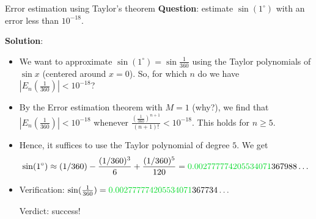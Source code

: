 \begin{frame}{Error estimation using Taylor's theorem}
    \textbf{Question}: estimate $\sin(1^\circ)$ with an error less than $10^{-18}$.

    \vspace{2mm}
    \textbf{Solution}: 
    \begin{itemize}
        \item We want to approximate $\sin(1^\circ)=\sin\frac1{360}$ using the Taylor polynomials of $\sin x$ (centered around $x=0$). So, for which $n$ do we have $|E_n(\frac1{360})|<10^{-18}$?

        \item By the Error estimation theorem with $M=1$ (why?), we find that $|E_n(\frac1{360})|<10^{-18}$ whenever $\frac{(\frac1{360})^{n+1}}{(n+1)!}<10^{-18}$. This holds for $n\geq5$.

        \item Hence, it suffices to use the Taylor polynomial of degree $5$. We get
            {\footnotesize\[\sin(1^\circ)\approx (1/360)-\frac{(1/360)^3}6+\frac{(1/360)^5}{120}={\color{green!70!teal}0.002777774205534071}367988\dots\]}

        \item Verification: {\footnotesize$\sin(\frac1{360})={\color{green!70!teal}0.002777774205534071}367734\dots$}
        
            Verdict: success!

        \end{itemize}
    
\end{frame}





